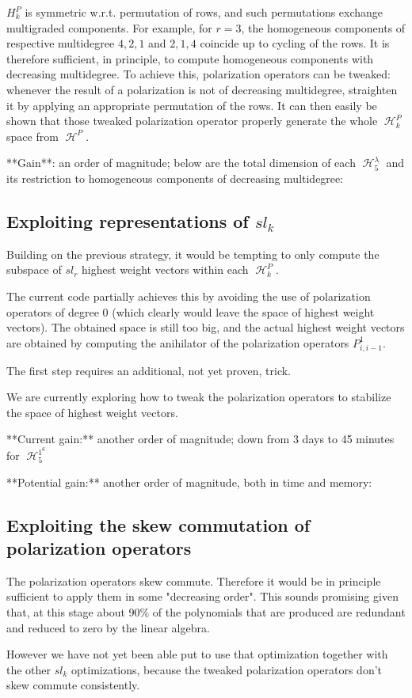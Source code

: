 \documentclass[letter,12pt]{article}
\DeclareMathOperator{\harmonics}{\mathcal{H}}
\begin{document}
	$H_k^P$ is symmetric w.r.t. permutation of rows, and such permutations
	exchange multigraded components. For example, for $r=3$, the homogeneous components of respective multidegree $4,2,1$ and $2,1,4$ coincide
	up to cycling of the rows. It is therefore sufficient, in principle, to compute homogeneous components with decreasing multidegree.
	To achieve this, polarization operators can be tweaked: whenever the result of a polarization is not of decreasing multidegree, straighten it by applying an appropriate permutation of the rows. It can then easily be shown that those tweaked polarization operator properly generate the whole $\harmonics_k^P$ space from $\harmonics^P$.
	
	**Gain**: an order of magnitude; below are the total dimension of each $\harmonics_5^\lambda$ and its restriction to homogeneous components of decreasing multidegree:
	
	\subsection{Exploiting representations of $sl_k$}
	
	Building on the previous strategy, it would be tempting to only compute the subspace of $sl_r$ highest weight vectors within each $\harmonics_k^P$.
	
	The current code partially achieves this by avoiding the use of polarization operators of degree $0$ (which clearly would leave the space of highest weight vectors). The obtained space is still too big, and the actual highest weight vectors are obtained by computing the anihilator of the polarization operators $P_{i,i-1}^1$.
	
	The first step requires an additional, not yet proven, trick.
	
	We are currently exploring how to tweak the polarization operators to stabilize the space of highest weight vectors.
	
	**Current gain:** another order of magnitude; down from 3 days to 45 minutes for $\harmonics_5^{1^6}$
	
	**Potential gain:** another order of magnitude, both in time and memory:
	
	\subsection{Exploiting the skew commutation of polarization operators}
	
	The polarization operators skew commute. Therefore it would be in principle sufficient to apply them in some "decreasing order". This sounds promising given that, at this stage about 90\% of the polynomials that are produced are redundant and reduced to zero by the linear algebra.
	
	However we have not yet been able put to use that optimization together with the other $sl_k$ optimizations, because the tweaked polarization operators don't skew commute consistently.
	

\nocite{*}

\end{document}
